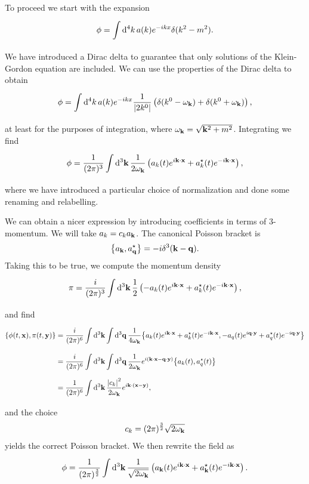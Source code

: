 To proceed we start with the expansion
\begin{align*}
	\phi = \int\limits_{}^{}\dd[4]{k}a(k)e^{-ikx}\delta(k^{2} - m^{2}).
\end{align*}
We have introduced a Dirac delta to guarantee that only solutions of the Klein-Gordon equation are included. We can use the properties of the Dirac delta to obtain
\begin{align*}
	\phi = \int\limits_{}^{}\dd[4]{k}a(k)e^{-ikx}\frac{1}{\abs{2k^{0}}}\left(\delta(k^{0} - \omega_{\vb{k}}) + \delta(k^{0} + \omega_{\vb{k}})\right),
\end{align*}
at least for the purposes of integration, where $\omega_{\vb{k}} = \sqrt{\vb{k}^{2} + m^{2}}$. Integrating we find
\begin{align*}
	\phi = \frac{1}{(2\pi)^{3}}\int\limits_{}^{}\dd[3]{\vb{k}}\frac{1}{2\omega_{\vb{k}}}\left(a_{k}(t)e^{i\vb{k}\cdot\vb{x}} + a_{k}^{\star}(t)e^{-i\vb{k}\cdot\vb{x}}\right),
\end{align*}
where we have introduced a particular choice of normalization and done some renaming and relabelling.

We can obtain a nicer expression by introducing coefficients in terms of $3$-momentum. We will take $a_{k} = c_{k}a_{\vb{k}}$. The canonical Poisson bracket is
\begin{align*}
	\pb{a_{\vb{k}}}{a_{\vb{q}}\cc} = -i\delta^{3}(\vb{k} - \vb{q}).
\end{align*}
Taking this to be true, we compute the momentum density
\begin{align*}
	\pi = \frac{i}{(2\pi)^{3}}\int\limits_{}^{}\dd[3]{\vb{k}}\frac{1}{2}\left(-a_{k}(t)e^{i\vb{k}\cdot\vb{x}} + a_{k}^{\star}(t)e^{-i\vb{k}\cdot\vb{x}}\right),
\end{align*}
and find
\begin{align*}
	\pb{\phi(t, \vb{x})}{\pi(t, \vb{y})} &= \frac{i}{(2\pi)^{6}}\integ[3]{}{}{\vb{k}}{\integ[3]{}{}{\vb{q}}{\frac{1}{4\omega_{\vb{k}}}\pb{a_{k}(t)e^{i\vb{k}\cdot\vb{x}} + a_{k}\cc(t)e^{-i\vb{k}\cdot\vb{x}}}{-a_{q}(t)e^{i\vb{q}\cdot\vb{y}} + a_{q}\cc(t)e^{-i\vb{q}\cdot\vb{y}}}}} \\
	&= \frac{i}{(2\pi)^{6}}\integ[3]{}{}{\vb{k}}{\integ[3]{}{}{\vb{q}}{\frac{1}{2\omega_{\vb{k}}}e^{i(\vb{k}\cdot\vb{x} - \vb{q}\cdot\vb{y})}\pb{a_{k}(t)}{a_{q}\cc(t)}}} \\
	&= \frac{1}{(2\pi)^{6}}\integ[3]{}{}{\vb{k}}{\frac{\abs{c_{k}}^{2}}{2\omega_{\vb{k}}}e^{i\vb{k}\cdot(\vb{x} - \vb{y})}},
\end{align*}
and the choice
\begin{align*}
	c_{k} = (2\pi)^{\frac{3}{2}}\sqrt{2\omega_{\vb{k}}}
\end{align*}
yields the correct Poisson bracket. We then rewrite the field as
\begin{align*}
	\phi = \frac{1}{(2\pi)^{\frac{3}{2}}}\int\limits_{}^{}\dd[3]{\vb{k}}\frac{1}{\sqrt{2\omega_{\vb{k}}}}\left(a_{\vb{k}}(t)e^{i\vb{k}\cdot\vb{x}} + a_{\vb{k}}^{\star}(t)e^{-i\vb{k}\cdot\vb{x}}\right).
\end{align*}

